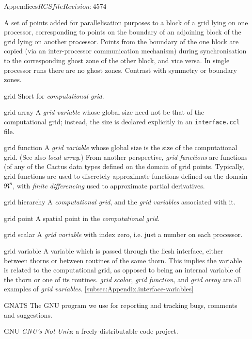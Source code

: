 \begin{cactuspart}{Appendices}{$RCSfile$}{$Revision: 4574 $}
\begin{Lentry}
  A set of points added for parallelisation purposes to a block of a
  grid lying on one processor, corresponding to points on the boundary
  of an adjoining block of the grid lying on another processor.
  Points from the boundary of the one block are copied (via an
  inter-processor communication mechanism) during synchronisation
  to the corresponding ghost zone of the other block, and vice versa.
  In single processor runs there are no ghost zones.
  Contrast with symmetry or boundary zones.
\item[grid]
  Short for \textit{computational grid}.
\item[grid array]
  A \textit{grid variable} whose global size need not be that of the
  computational grid; instead, the size is declared explicitly in an
  \verb|interface.ccl| file.  
\item[grid function]
  A \textit{grid variable} whose global size is the size of the
  computational grid.  (See also \textit{local array}.)
  From another perspective,
  \textit{grid functions} are functions (of any of the Cactus
  data types%
  defined on the domain of grid points.
  Typically, grid functions are used to discretely approximate functions
  defined on the domain $\Re^n$, with \textit{finite differencing}
  used to approximate partial derivatives.
\item[grid hierarchy]
  A \textit{computational grid}, and the \textit{grid variables} associated
  with it.
\item[grid point]
  A spatial point in the \textit{computational grid}.
\item[grid scalar]
  A \textit{grid variable} with index zero,
  i.e. just a number on each processor.
\item[grid variable]
  A variable which is passed through the flesh interface, either between 
  thorns or between routines of the same thorn.
  This implies the variable is related to the computational grid, as opposed
  to being an internal variable of the thorn or one of its routines. 
  \textit{grid scalar}, \textit{grid function}, and \textit{grid array}
  are all examples of \textit{grid variables}. 
  \ref{subsec:Appendix.interface-variables}
\item[GNATS]
  The GNU program we use for reporting and tracking bugs, comments and
  suggestions.
\item[GNU]
  \textit{GNU's Not Unix}: a freely-distributable code project.  

\end{Lentry}
\end{cactuspart}
